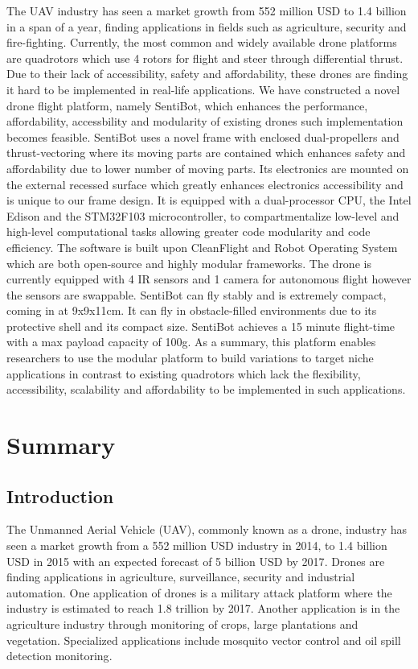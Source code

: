 \documentclass[12pt]{article}
\begin{document}
The UAV industry has seen a market growth from 552 million USD to 1.4 billion in a span of a year, finding applications in fields such as agriculture, security and fire-fighting. Currently, the most common and widely available drone platforms are quadrotors which use 4 rotors for flight and steer through differential thrust. Due to their lack of accessibility, safety and affordability, these drones are finding it hard to be implemented in real-life applications. We have constructed a novel drone flight platform, namely SentiBot, which enhances the performance, affordability, accessbility and modularity of existing drones such implementation becomes feasible. SentiBot uses a novel frame with enclosed dual-propellers and thrust-vectoring where its moving parts are contained which enhances safety and affordability due to lower number of moving parts. Its electronics are mounted on the external recessed surface which greatly enhances electronics accessibility and is unique to our frame design. It is equipped with a dual-processor CPU, the Intel Edison and the STM32F103 microcontroller, to compartmentalize low-level and high-level computational tasks allowing greater code modularity and code efficiency. The software is built upon CleanFlight and Robot Operating System which are both open-source and highly modular frameworks. The drone is currently equipped with 4 IR sensors and 1 camera for autonomous flight however the sensors are swappable. SentiBot can fly stably and is extremely compact, coming in at 9x9x11cm. It can fly in obstacle-filled environments due to its protective shell and its compact size. SentiBot achieves a 15 minute flight-time with a max payload capacity of 100g. As a summary, this platform enables researchers to use the modular platform to build variations to target niche applications in contrast to existing quadrotors which lack the flexibility, accessibility, scalability and affordability to be implemented in such applications. 

\newpage

\section{Summary}

\subsection{Introduction}

The Unmanned Aerial Vehicle (UAV), commonly known as a drone, industry has seen a market growth from a 552 million USD industry in 2014, to 1.4 billion USD in 2015 with an expected forecast of 5 billion USD by 2017\cite{legalandsocial}. Drones are finding applications in agriculture, surveillance, security and industrial automation. One application of drones is a military attack platform where the industry is estimated to reach 1.8 trillion by 2017\cite{dronewars}. Another application is in the agriculture industry through monitoring of crops, large plantations and vegetation\cite{agriculture}. Specialized applications include mosquito vector control\cite{mosquito} and oil spill detection monitoring\cite{oilspill}. 
\end{document}
